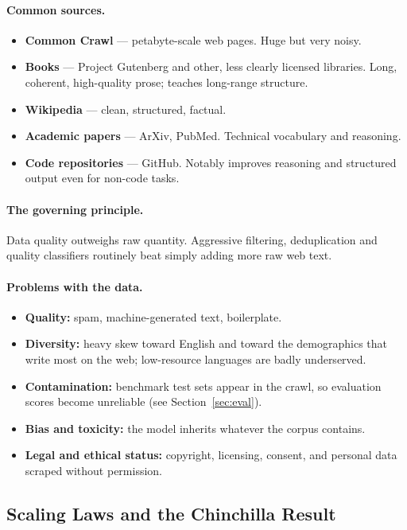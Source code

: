 \documentclass[11pt,a4paper]{article}
\begin{document}
\paragraph{Common sources.}
\begin{itemize}
\item \textbf{Common Crawl} --- petabyte-scale web pages. Huge but very noisy.
\item \textbf{Books} --- Project Gutenberg and other, less clearly licensed libraries. Long,
  coherent, high-quality prose; teaches long-range structure.
\item \textbf{Wikipedia} --- clean, structured, factual.
\item \textbf{Academic papers} --- ArXiv, PubMed. Technical vocabulary and reasoning.
\item \textbf{Code repositories} --- GitHub. Notably improves reasoning and structured output
  even for non-code tasks.
\end{itemize}

\paragraph{The governing principle.} Data quality outweighs raw quantity. Aggressive
filtering, deduplication and quality classifiers routinely beat simply adding more raw web
text.

\paragraph{Problems with the data.}
\begin{itemize}
\item \textbf{Quality:} spam, machine-generated text, boilerplate.
\item \textbf{Diversity:} heavy skew toward English and toward the demographics that write
  most on the web; low-resource languages are badly underserved.
\item \textbf{Contamination:} benchmark test sets appear in the crawl, so evaluation scores
  become unreliable (see Section~\ref{sec:eval}).
\item \textbf{Bias and toxicity:} the model inherits whatever the corpus contains.
\item \textbf{Legal and ethical status:} copyright, licensing, consent, and personal data
  scraped without permission.
\end{itemize}

\subsection{Scaling Laws and the Chinchilla Result}
\end{document}
